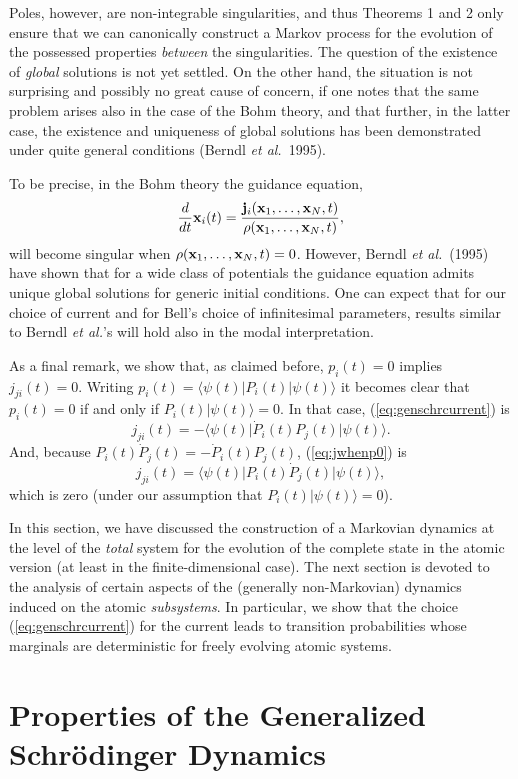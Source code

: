 \documentclass[12pt]{article}
\newcommand{\be}{\begin{equation}}
\newcommand{\ee}{\end{equation}}
\newcommand{\bra}[1]{\langle #1\vert}                           %
\newcommand{\ket}[1]{\vert #1\rangle}                           %
\begin{document}
Poles, however, are non-integrable singularities, and thus Theorems 1 
and 2 only ensure that we can canonically construct a Markov process 
for the evolution of the possessed properties {\em between} the 
singularities.  The question of the existence of {\em global} 
solutions is not yet settled.  On the other hand, the situation is not 
surprising and possibly no great cause of concern, if one notes that 
the same problem arises also in the case of the Bohm theory, and that 
further, in the latter case, the existence and uniqueness of global 
solutions has been demonstrated under quite general conditions (Berndl 
{\em et al.}\ 1995).

To be precise, in the Bohm theory the guidance equation,
\be
  \frac{d}{dt}{\bf x}_i(t)
    =\frac{{\bf j}_i({\bf x}_1,\ldots,{\bf x}_N,t)}{\rho({\bf x}_1,
    \ldots,{\bf x}_N,t)},
\ee
will become singular when $\rho({\bf x}_1,\ldots,{\bf x}_N,t)=0$.  
However, Berndl {\em et al.}\ (1995) have shown that for a wide class 
of potentials the guidance equation admits unique global solutions for 
generic initial conditions.  One can expect that for our choice of 
current and for Bell's choice of infinitesimal parameters, results 
similar to Berndl {\em et al.}'s will hold also in the modal 
interpretation.

As a final remark, we show that, as claimed before, $p_i(t) = 0$ 
implies $j_{ji}(t) = 0$.  Writing 
$p_i(t)=\bra{\psi(t)}P_i(t)\ket{\psi(t)}$ it becomes clear that 
$p_i(t) = 0$ if and only if $P_i(t)\ket{\psi(t)} = 0$.  In that case, 
(\ref{eq:genschrcurrent}) is
\be
  \label{eq:jwhenp0}
  j_{ji}(t) = -\bra{\psi(t)}\dot{P}_i(t)P_j(t)\ket{\psi(t)}.
\ee
And, because $P_i(t)\dot{P}_j(t) = - \dot{P}_i(t)P_j(t)$,
(\ref{eq:jwhenp0}) is
\be
  j_{ji}(t) = \bra{\psi(t)}P_i(t)\dot{P}_j(t)\ket{\psi(t)},
\ee
which is zero (under our assumption that $P_i(t)\ket{\psi(t)} = 0$).

In this section, we have discussed the construction of a Markovian 
dynamics at the level of the {\em total} system for the evolution of 
the complete state in the atomic version (at least in the 
finite-dimensional case).  The next section is devoted to the analysis 
of certain aspects of the (generally non-Markovian) dynamics induced 
on the atomic {\em subsystems}.  In particular, we show that the 
choice (\ref{eq:genschrcurrent}) for the current leads to transition 
probabilities whose marginals are deterministic for freely evolving 
atomic systems.


\section{Properties of the Generalized Schr\"odinger Dynamics}
\end{document}
